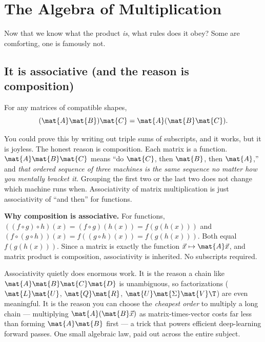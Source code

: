 \section{The Algebra of Multiplication}
\label{ch08:algebra}

Now that we know what the product \emph{is}, what rules does it obey? Some are
comforting, one is famously not.

\subsection{It is associative (and the reason is composition)}

\begin{theorem}[Associativity]
\label{ch08:assoc}
For any matrices of compatible shapes,
\[
(\mat{A}\mat{B})\mat{C} = \mat{A}(\mat{B}\mat{C}).
\]
\end{theorem}

You could prove this by writing out triple sums of subscripts, and it works, but it is
joyless. The honest reason is composition. Each matrix is a function. $\mat{A}\mat{B}\mat{C}$
means ``do $\mat{C}$, then $\mat{B}$, then $\mat{A}$,'' and \emph{that ordered sequence
of three machines is the same sequence no matter how you mentally bracket it.} Grouping
the first two or the last two does not change which machine runs when. Associativity of
matrix multiplication is just associativity of ``and then'' for functions.

\begin{formalbox}
\textbf{Why composition is associative.} For functions, $((f\circ g)\circ h)(x) =
(f\circ g)(h(x)) = f(g(h(x)))$ and $(f\circ(g\circ h))(x) = f((g\circ h)(x)) =
f(g(h(x)))$. Both equal $f(g(h(x)))$. Since a matrix is exactly the function
$\vec{x}\mapsto \mat{A}\vec{x}$, and matrix product is composition, associativity is
inherited. No subscripts required.
\end{formalbox}

\begin{aestheticbox}
Associativity quietly does enormous work. It is the reason a chain like $\mat{A}\mat{B}\mat{C}\mat{D}$ is unambiguous, so factorizations ($\mat{L}\mat{U}$, $\mat{Q}\mat{R}$,
$\mat{U}\mat{\Sigma}\mat{V}\T$) are even meaningful. It is the reason you can choose the
\emph{cheapest order} to multiply a long chain --- multiplying $\mat{A}(\mat{B}\vec{x})$
as matrix-times-vector costs far less than forming $\mat{A}\mat{B}$ first --- a trick
that powers efficient deep-learning forward passes. One small algebraic law, paid out
across the entire subject.
\end{aestheticbox}


